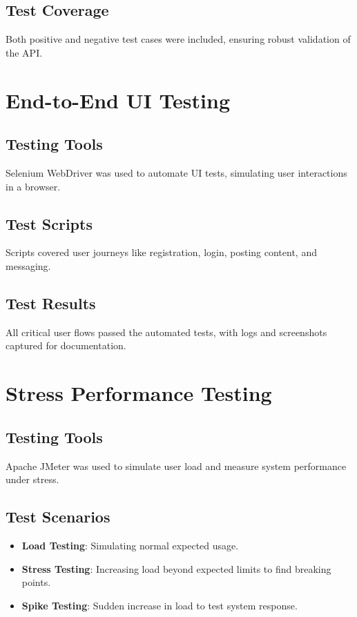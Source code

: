 \documentclass[12pt,a4paper]{report}
\begin{document}
\section{Test Coverage}
Both positive and negative test cases were included, ensuring robust validation of the API.

\chapter{End-to-End UI Testing}
\section{Testing Tools}
Selenium WebDriver was used to automate UI tests, simulating user interactions in a browser.

\section{Test Scripts}
Scripts covered user journeys like registration, login, posting content, and messaging.

\section{Test Results}
All critical user flows passed the automated tests, with logs and screenshots captured for documentation.

\chapter{Stress Performance Testing}
\section{Testing Tools}
Apache JMeter was used to simulate user load and measure system performance under stress.

\section{Test Scenarios}
\begin{itemize}
    \item \textbf{Load Testing}: Simulating normal expected usage.
    \item \textbf{Stress Testing}: Increasing load beyond expected limits to find breaking points.
    \item \textbf{Spike Testing}: Sudden increase in load to test system response.
\end{itemize}
\end{document}
